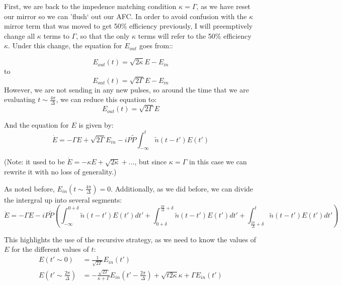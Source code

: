 \documentclass[12pt]{article}
\begin{document}
First, we are back to the impedence matching condition $\kappa = \Gamma$, as we have reset our mirror so
we can 'flush` out our AFC. In order to avoid confusion with the $\kappa$ mirror term that was moved to get
50\% efficiency previously, I will preemptively change all $\kappa$ terms to $\Gamma$, so that the only $\kappa$ terms will refer to the 50\% efficiency $\kappa$.
Under this change,  the equation for $E_{out}$ goes from::

\begin{equation}
E_{out}(t) = \sqrt{2\kappa} E - E_{in}
\end{equation}
to
\begin{equation}
E_{out}(t) = \sqrt{2 \Gamma} E - E_{in}
\end{equation}
However, we are not sending in any new pulses, so around the time that we are evaluating $t \sim \frac{4 \pi}{\Delta}$, we can reduce this equation to:
\begin{equation}
E_{out}(t) = \sqrt{2\Gamma} E
\end{equation}

And the equation for $E$ is given by:
\begin{equation}
\dot{E} = -\Gamma E +\sqrt{2\Gamma} E_{in} - iP\tilde{P} \int^t_{-\infty} \tilde{n}(t-t') E(t')
\end{equation}

(Note: it used to be $\dot{E} = - \kappa E + \sqrt{2 \kappa} +...$, but since $\kappa = \Gamma$ in this case
we can rewrite it with no loss of generality.)


As noted before, $E_{in}(t\sim \frac{4 \pi}{\Delta}) = 0$. Additionally, as we did before, we can divide the intergral up into several segments:
\begin{equation}
\label{eq:afcp02s1}
\dot{E} = -\Gamma E  -i P \tilde{P}\left( \int_{-\infty}^{0+\delta}\tilde{n}(t-t')E(t') dt'+\int^{\frac{2 \pi}{\Delta}+\delta}_{0+\delta} \tilde{n}(t-t') E(t') dt'+ \int^t_{\frac{2 \pi}{\Delta}+\delta} \tilde{n}(t-t') E(t') dt'\right)
\end{equation}

This highlights the use of the recursive strategy, as we need to know the values of $E$ for the different values of $t$:
\begin{align}
E(t'\sim 0) &= \frac{1}{\sqrt{2 \Gamma}} E_{in}(t')\\
E(t' \sim \frac{2 \pi}{\Delta}) &=- \frac{\sqrt{2 \Gamma}}{\kappa +\Gamma} E_{in}(t'-\frac{2 \pi}{\Delta} )+\sqrt{t{2 \kappa}}{\kappa+\Gamma} E_{in}(t')\\
\end{align}
\end{document}
